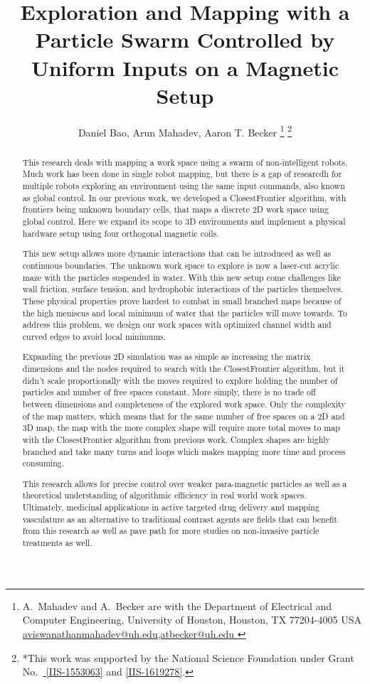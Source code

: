 \documentclass[letterpaper, 10 pt, conference]{ieeeconf}  %
\title{\LARGE \bf
Exploration and Mapping with a Particle Swarm Controlled by Uniform Inputs on a Magnetic Setup
}
\author{Daniel Bao, Arun Mahadev, Aaron T. Becker%
\thanks{A.~Mahadev and A.~Becker are with the Department of Electrical and Computer Engineering,  University of Houston, Houston, TX 77204-4005 USA 
      \protect\url{ aviswanathanmahadev@uh.edu,atbecker@uh.edu }}
\thanks{*This work was supported by the National Science Foundation under Grant No.\ \href{http://nsf.gov/awardsearch/showAward?AWD_ID=1553063}{ [IIS-1553063]} and \href{http://nsf.gov/awardsearch/showAward?AWD_ID=1619278}{[IIS-1619278]}.}%
}
\begin{document}
\maketitle
\thispagestyle{empty}
\pagestyle{empty}


\begin{abstract}

This research deals with mapping a work space using a swarm of non-intelligent robots. Much work has been done in single robot mapping, but there is a gap of researcdh for multiple robots exploring an environment using the same input commands, also known as global control. In our previous work\cite{AAM}, we developed a ClosestFrontier algorithm, with frontiers being unknown boundary cells, that maps a discrete 2D work space using global control. Here we expand its scope to 3D environments and implement a physical hardware setup using four orthogonal magnetic coils.

This new setup allows more dynamic interactions that can be introduced as well as continuous boundaries. The unknown work space to explore is now a laser-cut acrylic maze with the particles suspended in water. With this new setup come challenges like wall friction, surface tension, and  hydrophobic interactions of the particles themselves. These physical properties prove hardest to combat in small branched maps because of the high meniscus and local minimum of water that the particles will move towards. To address this problem, we design our work spaces with optimized channel width and curved edges to avoid local minimums.

Expanding the previous 2D simulation was as simple as increasing the matrix dimensions and the nodes required to search with the ClosestFrontier algorithm, but it didn't scale proportionally with the moves required to explore holding the number of particles and number of free spaces constant. More simply, there is no trade off between dimensions and completeness of the explored work space. Only the complexity of the map matters, which means that for the same number of free spaces on a 2D and 3D map, the map with the more complex shape will require more total moves to map with the ClosestFrontier algorithm from previous work. Complex shapes are highly branched and take many turns and loops which makes mapping more time and process consuming.

This research allows for precise control over weaker para-magnetic particles as well as a theoretical understanding of algorithmic efficiency in real world work spaces. Ultimately, medicinal applications in active targeted drug delivery and mapping vasculature as an alternative to traditional contrast agents are fields that can benefit from this research as well as pave path for more studies on non-invasive particle treatments as well. 
\end{abstract}
\end{document}
